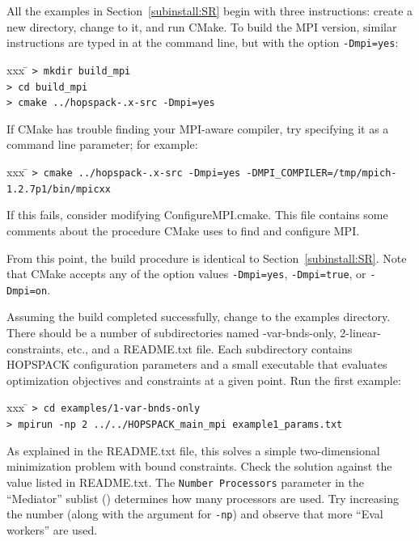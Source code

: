 All the examples in Section~\ref{subinstall:SR} begin with three instructions:
create a new directory, change to it, and run CMake.
To build the MPI version, similar instructions are typed
in at the command line, but with the option {\tt -Dmpi=yes}:
\vspace{-11pt}
\begin{tabbing}
  xxx \= \kill
  \> {\tt > mkdir build\_mpi} \\
  \> {\tt > cd build\_mpi} \\
  \> {\tt > cmake ../hopspack-\HOPSVER.x-src -Dmpi=yes}
\end{tabbing}
\vspace{-11pt}
If CMake has trouble finding your MPI-aware compiler, try specifying
it as a command line parameter; for example:
\vspace{-11pt}
\begin{tabbing}
  xxx \= \kill
  \> {\tt > cmake ../hopspack-\HOPSVER.x-src -Dmpi=yes
            -DMPI\_COMPILER=/tmp/mpich-1.2.7p1/bin/mpicxx}
\end{tabbing}
\vspace{-11pt}
If this fails, consider modifying {\sf ConfigureMPI.cmake}.  This file contains
some comments about the procedure CMake uses to find and configure MPI.

From this point, the build procedure is identical to Section~\ref{subinstall:SR}.
Note that CMake accepts any of the option values {\tt -Dmpi=yes},
{\tt -Dmpi=true}, or {\tt -Dmpi=on}.

Assuming the build completed successfully, change to the {\sf examples}
directory.  There should be a number of subdirectories named
{-var-bnds-only, 2-linear-constraints}, etc., and a {\sf README.txt} file.
Each subdirectory contains HOPSPACK configuration parameters and a small
executable that evaluates optimization objectives and constraints at a given
point.
Run the first example:
\vspace{-11pt}
\begin{tabbing}
  xxx \= \kill
  \> {\tt > cd examples/1-var-bnds-only} \\
  \> {\tt > mpirun -np 2 ../../HOPSPACK\_main\_mpi example1\_params.txt}
\end{tabbing}
\vspace{-11pt}
As explained in the {\sf README.txt} file, this solves a simple two-dimensional
minimization problem with bound constraints.  Check the solution against
the value listed in {\sf README.txt}.
The {\tt Number Processors} parameter in the ``Mediator'' sublist
() determines how many processors are used.
Try increasing the number (along with the argument for {\tt -np})
and observe that more ``Eval workers'' are used.

